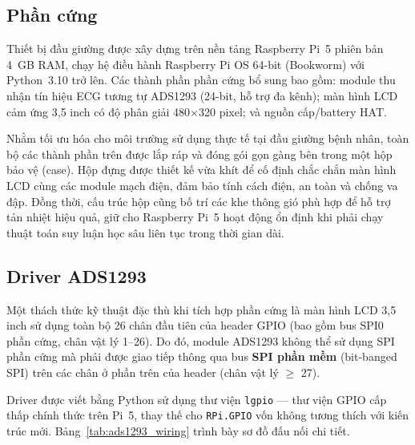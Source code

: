 \documentclass[../DoAn.tex]{subfiles}
\begin{document}
\subsection{Phần cứng}

Thiết bị đầu giường được xây dựng trên nền tảng Raspberry Pi~5 phiên bản 4~GB RAM, chạy hệ điều hành Raspberry Pi OS 64-bit (Bookworm) với Python~3.10 trở lên. Các thành phần phần cứng bổ sung bao gồm: module thu nhận tín hiệu ECG tương tự ADS1293 (24-bit, hỗ trợ đa kênh); màn hình LCD cảm ứng 3{,}5 inch có độ phân giải 480$\times$320 pixel; và nguồn cấp/battery HAT.

Nhằm tối ưu hóa cho môi trường sử dụng thực tế tại đầu giường bệnh nhân, toàn bộ các thành phần trên được lắp ráp và đóng gói gọn gàng bên trong một hộp bảo vệ (case). Hộp đựng được thiết kế vừa khít để cố định chắc chắn màn hình LCD cùng các module mạch điện, đảm bảo tính cách điện, an toàn và chống va đập. Đồng thời, cấu trúc hộp cũng bố trí các khe thông gió phù hợp để hỗ trợ tản nhiệt hiệu quả, giữ cho Raspberry Pi~5 hoạt động ổn định khi phải chạy thuật toán suy luận học sâu liên tục trong thời gian dài.

\subsection{Driver ADS1293}

Một thách thức kỹ thuật đặc thù khi tích hợp phần cứng là màn hình LCD 3{,}5 inch sử dụng toàn bộ 26 chân đầu tiên của header GPIO (bao gồm bus SPI0 phần cứng, chân vật lý 1--26). Do đó, module ADS1293 không thể sử dụng SPI phần cứng mà phải được giao tiếp thông qua bus \textbf{SPI phần mềm} (bit-banged SPI) trên các chân ở phần trên của header (chân vật lý $\geq$ 27).

Driver được viết bằng Python sử dụng thư viện \texttt{lgpio} --- thư viện GPIO cấp thấp chính thức trên Pi~5, thay thế cho \texttt{RPi.GPIO} vốn không tương thích với kiến trúc mới. Bảng~\ref{tab:ads1293_wiring} trình bày sơ đồ đấu nối chi tiết.
\end{document}
